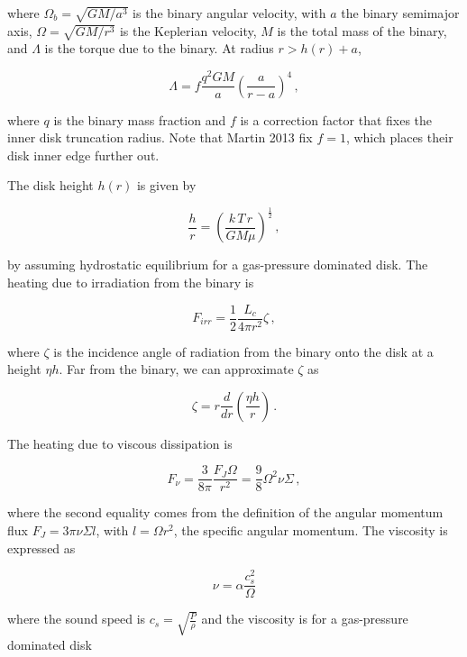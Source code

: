 \documentclass{article}
\begin{document}
where $\Omega_b = \sqrt{G M/a^3}$ is the binary angular velocity, with $a$ the binary semimajor axis, $\Omega = \sqrt{G M/r^{3}}$ is the Keplerian velocity, $M$ is the total mass of the binary, and $\Lambda$ is the torque due to the binary. At radius $r > h(r) + a$,

\begin{equation}
\Lambda = f \frac{q^2 GM}{a} \left(\frac{a}{r-a}\right)^4\,,
\end{equation}

where $q$ is the binary mass fraction and $f$ is a correction factor that fixes the inner disk truncation radius. Note that Martin 2013 fix $f =1$, which places their disk inner edge further out. 

The disk height $h(r)$ is given by

\begin{equation}
\frac{h}{r} = \left(\frac{k\,T\,r}{G M\mu}\right)^\frac{1}{2} \,,
\end{equation}

by assuming hydrostatic equilibrium for a gas-pressure dominated disk.
The heating due to irradiation from the binary is

\begin{equation}
F_{irr} = \frac{1}{2} \frac{L_c}{4\pi r^2} \zeta\,,
\end{equation}

where $\zeta$ is the incidence angle of radiation from the binary onto the disk at a height $\eta h$. Far from the binary, we can approximate $\zeta$ as

\begin{equation}
\zeta = r \frac{d}{dr} \left(\frac{\eta h}{r}\right)\,.
\end{equation}

The heating due to viscous dissipation is

\begin{equation}
F_\nu = \frac{3}{8\pi} \frac{F_J \Omega}{r^2} = \frac{9}{8} \Omega^2 \nu \Sigma\,,
\end{equation}

where the second equality comes from the definition of the angular momentum flux $F_J = 3 \pi \nu \Sigma l$, with $l = \Omega r^2$, the specific angular momentum. The viscosity is expressed as

\begin{equation}
\nu = \alpha \frac{c_s^2}{\Omega}
\end{equation}

where the sound speed is $c_s = \sqrt{\frac{P}{\rho}}$ and the viscosity is for a gas-pressure dominated disk 
 
\end{document}
